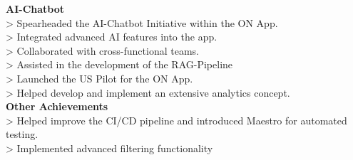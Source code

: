 \documentclass[10pt,a4paper,normalphoto]{altacv}
\begin{document}
\vspace{2em}



\textbf{AI-Chatbot}\\
> Spearheaded the AI-Chatbot Initiative within the ON App.\\
> Integrated advanced AI features into the app.\\
> Collaborated with cross-functional teams.\\
> Assisted in the development of the RAG-Pipeline \\
> Launched the US Pilot for the ON App.\\
> Helped develop and implement an extensive analytics concept.\\

\vspace{.5em}
\textbf{Other Achievements}\\
> Helped improve the CI/CD pipeline and introduced Maestro for automated testing.\\
> Implemented advanced filtering functionality 

\vspace{1em}

\end{document}
